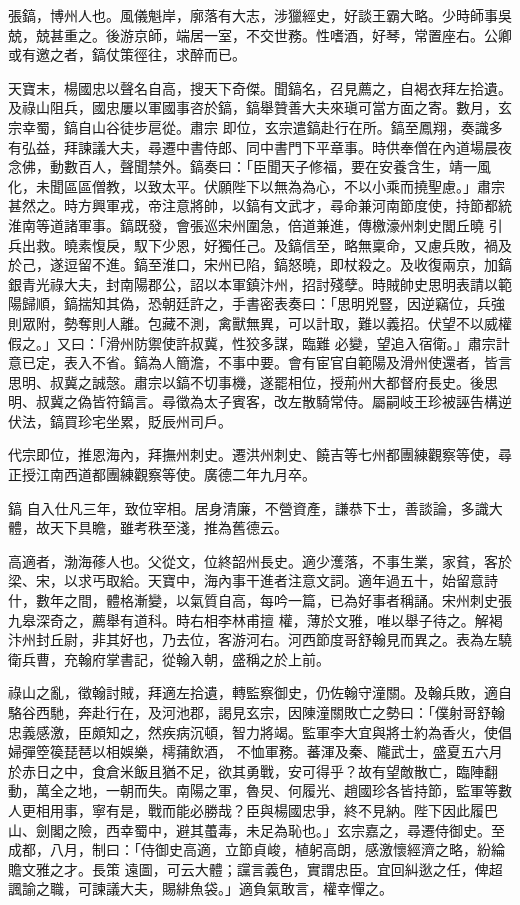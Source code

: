 \begin{pinyinscope}
 張鎬，博州人也。風儀魁岸，廓落有大志，涉獵經史，好談王霸大略。少時師事吳兢，兢甚重之。後游京師，端居一室，不交世務。性嗜酒，好琴，常置座右。公卿或有邀之者，鎬仗策徑往，求醉而已。



 天寶末，楊國忠以聲名自高，搜天下奇傑。聞鎬名，召見薦之，自褐衣拜左拾遺。及祿山阻兵，國忠屢以軍國事咨於鎬，鎬舉贊善大夫來瑱可當方面之寄。數月，玄宗幸蜀，鎬自山谷徒步扈從。肅宗
 即位，玄宗遣鎬赴行在所。鎬至鳳翔，奏識多有弘益，拜諫議大夫，尋遷中書侍郎、同中書門下平章事。時供奉僧在內道場晨夜念佛，動數百人，聲聞禁外。鎬奏曰：「臣聞天子修福，要在安養含生，靖一風化，未聞區區僧教，以致太平。伏願陛下以無為為心，不以小乘而撓聖慮。」肅宗甚然之。時方興軍戎，帝注意將帥，以鎬有文武才，尋命兼河南節度使，持節都統淮南等道諸軍事。鎬既發，會張巡宋州圍急，倍道兼進，傳檄濠州刺史閭丘曉
 引兵出救。曉素愎戾，馭下少恩，好獨任己。及鎬信至，略無稟命，又慮兵敗，禍及於己，遂逗留不進。鎬至淮口，宋州已陷，鎬怒曉，即杖殺之。及收復兩京，加鎬銀青光祿大夫，封南陽郡公，詔以本軍鎮汴州，招討殘孽。時賊帥史思明表請以範陽歸順，鎬揣知其偽，恐朝廷許之，手書密表奏曰：「思明兇豎，因逆竊位，兵強則眾附，勢奪則人離。包藏不測，禽獸無異，可以計取，難以義招。伏望不以威權假之。」又曰：「滑州防禦使許叔冀，性狡多謀，臨難
 必變，望追入宿衛。」肅宗計意已定，表入不省。鎬為人簡澹，不事中要。會有宦官自範陽及滑州使還者，皆言思明、叔冀之誠愨。肅宗以鎬不切事機，遂罷相位，授荊州大都督府長史。後思明、叔冀之偽皆符鎬言。尋徵為太子賓客，改左散騎常侍。屬嗣岐王珍被誣告構逆伏法，鎬買珍宅坐累，貶辰州司戶。



 代宗即位，推恩海內，拜撫州刺史。遷洪州刺史、饒吉等七州都團練觀察等使，尋正授江南西道都團練觀察等使。廣德二年九月卒。



 鎬
 自入仕凡三年，致位宰相。居身清廉，不營資產，謙恭下士，善談論，多識大體，故天下具瞻，雖考秩至淺，推為舊德云。



 高適者，渤海蓚人也。父從文，位終韶州長史。適少濩落，不事生業，家貧，客於梁、宋，以求丐取給。天寶中，海內事干進者注意文詞。適年過五十，始留意詩什，數年之間，體格漸變，以氣質自高，每吟一篇，已為好事者稱誦。宋州刺史張九皋深奇之，薦舉有道科。時右相李林甫擅
 權，薄於文雅，唯以舉子待之。解褐汴州封丘尉，非其好也，乃去位，客游河右。河西節度哥舒翰見而異之。表為左驍衛兵曹，充翰府掌書記，從翰入朝，盛稱之於上前。



 祿山之亂，徵翰討賊，拜適左拾遺，轉監察御史，仍佐翰守潼關。及翰兵敗，適自駱谷西馳，奔赴行在，及河池郡，謁見玄宗，因陳潼關敗亡之勢曰：「僕射哥舒翰忠義感激，臣頗知之，然疾病沉頓，智力將竭。監軍李大宜與將士約為香火，使倡婦彈箜篌琵琶以相娛樂，樗蒱飲酒，
 不恤軍務。蕃渾及秦、隴武士，盛夏五六月於赤日之中，食倉米飯且猶不足，欲其勇戰，安可得乎？故有望敵散亡，臨陣翻動，萬全之地，一朝而失。南陽之軍，魯炅、何履光、趙國珍各皆持節，監軍等數人更相用事，寧有是，戰而能必勝哉？臣與楊國忠爭，終不見納。陛下因此履巴山、劍閣之險，西幸蜀中，避其蠆毒，未足為恥也。」玄宗嘉之，尋遷侍御史。至成都，八月，制曰：「侍御史高適，立節貞峻，植躬高朗，感激懷經濟之略，紛綸贍文雅之才。長策
 遠圖，可云大體；讜言義色，實謂忠臣。宜回糾逖之任，俾超諷諭之職，可諫議大夫，賜緋魚袋。」適負氣敢言，權幸憚之。




\end{pinyinscope}
